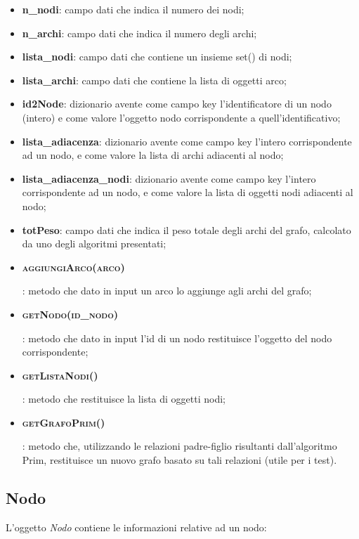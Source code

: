 \begin{itemize}
    \item \textbf{n\_nodi}: campo dati che indica il numero dei nodi;
    \item \textbf{n\_archi}: campo dati che indica il numero degli archi;
    \item \textbf{lista\_nodi}: campo dati che contiene un insieme set() di nodi; 
    \item \textbf{lista\_archi}: campo dati che contiene la lista di oggetti arco;
    \item \textbf{id2Node}: dizionario avente come campo key l'identificatore di un nodo (intero) e come valore l'oggetto nodo corrispondente a quell'identificativo;
    \item \textbf{lista\_adiacenza}: dizionario avente come campo key l'intero corrispondente ad un nodo,  e come valore la lista di archi adiacenti al nodo;
    \item \textbf{lista\_adiacenza\_nodi}: dizionario avente come campo key l'intero corrispondente ad un nodo,  e come valore la lista di oggetti nodi adiacenti al nodo;
    \item \textbf{totPeso}: campo dati che indica il peso totale degli archi del grafo, calcolato da uno degli algoritmi presentati;
    \item \hypertarget{aggiungiarco}{\textbf{\textsc{aggiungiArco(arco)}}}: metodo che dato in input un arco lo aggiunge agli archi del grafo;
    \item \hypertarget{getnodo}{\textbf{\textsc{getNodo(id\_nodo)}}}: metodo che dato in input l'id di un nodo restituisce l'oggetto del nodo corrispondente;
    \item \hypertarget{getlistanodi}{\textbf{\textsc{getListaNodi()}}}: metodo che restituisce la lista di  oggetti nodi;
    \item \hypertarget{getgrafoprim}{\textbf{\textsc{getGrafoPrim()}}}: metodo che, utilizzando le relazioni padre-figlio risultanti dall'algoritmo Prim, restituisce un nuovo grafo basato su tali relazioni (utile per i test).
\end{itemize}


\subsection{Nodo}
\label{Nodo}

L'oggetto \textit{Nodo} contiene le informazioni relative ad un nodo:

